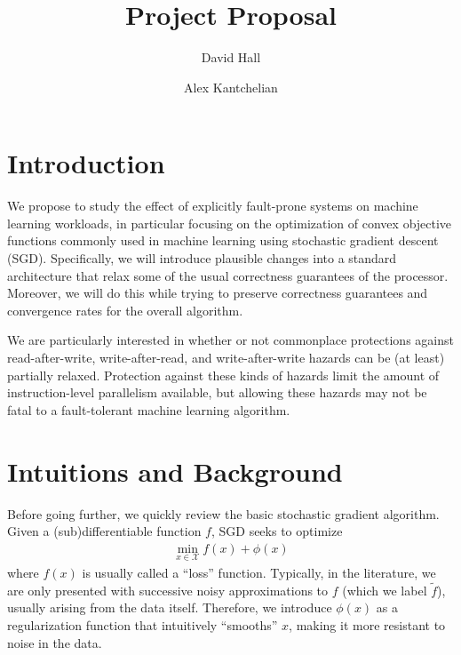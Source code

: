 \documentclass[12pt,leqno,twoside]{article}
\title{Project Proposal}
\author{David Hall \and Alex Kantchelian}
\begin{document}
\maketitle

\section{Introduction}

We propose to study the effect of explicitly fault-prone systems
on machine learning workloads, in particular focusing on the
optimization of convex objective functions commonly used in machine
learning using stochastic gradient descent (SGD). Specifically, we
will introduce plausible changes into a standard architecture that
relax some of the usual correctness guarantees of the processor.
Moreover, we will do this while trying to preserve correctness
guarantees and convergence rates for the overall algorithm. 

We are particularly interested in whether or not commonplace
protections against read-after-write, write-after-read, and
write-after-write hazards can be (at least) partially relaxed.
Protection against these kinds of hazards limit the amount of
instruction-level parallelism available, but allowing these hazards
may not be fatal to a fault-tolerant machine learning algorithm.


\section{Intuitions and Background}

Before going further, we quickly review the basic stochastic gradient
algorithm. Given a (sub)differentiable function $f$, SGD seeks to
optimize \begin{equation}
  \begin{split}
    \min_{x \in \mathcal{X}} f(x) + \phi(x)
   \end{split}
 \end{equation}
where $f(x)$ is usually called a ``loss'' function.  Typically, in
the literature, we are only presented with successive noisy
approximations to $f$ (which we label $\tilde f$), usually arising from the data itself.  Therefore,
we introduce  $\phi(x)$ as a regularization function that intuitively
``smooths'' $x$, making it more resistant to noise in the data.
\end{document}
